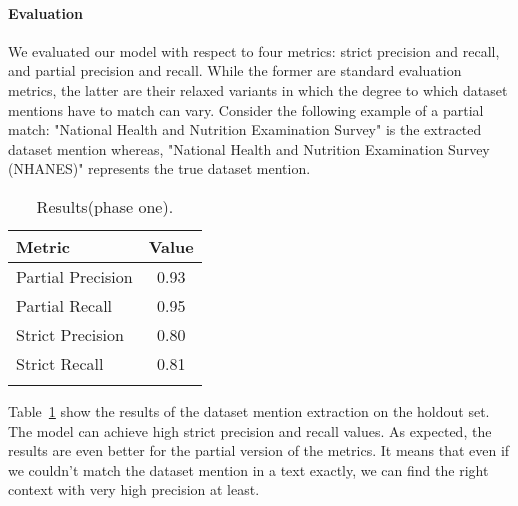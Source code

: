 \paragraph{Evaluation}
We evaluated our model with respect to four metrics: strict precision and recall, and partial precision and recall. While the former are standard evaluation metrics, the latter are their relaxed variants in which the degree to which dataset mentions have to match can vary. 
Consider the following example of a partial match: "National Health and Nutrition Examination Survey" is the extracted dataset mention whereas, "National Health and Nutrition Examination Survey (NHANES)" represents the true dataset mention. 
\begin{table}[b]
    \center 
    \caption{Results(phase one). } 
    \begin{tabular}{lc} 
        \toprule
        Metric  & Value \\
        \midrule
        Partial Precision   & 0.93 \\
        Partial Recall      & 0.95 \\
        \midrule
        Strict Precision    & 0.80 \\
        Strict Recall       & 0.81 \\ 
        \bottomrule \\ 
    \end{tabular} 
    \label{table:dataset-mention-eval} 
\end{table}

Table~\ref{table:dataset-mention-eval} show the results of the dataset mention extraction on the holdout set. The model can achieve high strict precision and recall values. As expected, the results are even better for the partial version of the metrics. It means that even if we couldn't match the dataset mention in a text exactly, we can find the right context with very high precision at least.

